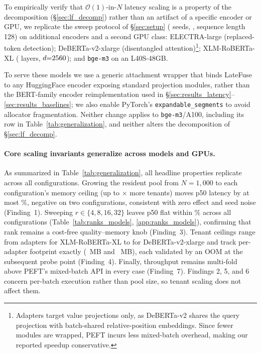 \documentclass[11pt]{article}
\newcommand{\sysname}{LateFuse}
\begin{document}
To empirically verify that $\mathcal{O}(1)$-in-$N$ latency scaling is a property of the
decomposition (\S\ref{sec:lf_decomp}) rather than an artifact of a specific encoder or GPU,
we replicate the sweep protocol of \S\ref{sec:setup} (\SweepNumSeeds{} seeds,
\HeadlineDtype{}, sequence length 128) on \GenNumNewEncoders{} additional encoders and a
second GPU class:
ELECTRA-large \cite{clark2020electra} (replaced-token detection);
DeBERTa-v2-xlarge \cite{he2021deberta} (disentangled attention)\footnote{Adapters target value projections only,
  as DeBERTa-v2 shares the query projection with
  batch-shared relative-position embeddings. Since fewer modules are wrapped,
  PEFT incurs less mixed-batch overhead, making our reported speedup
  conservative.};
XLM-RoBERTa-XL \cite{goyal-etal-2021-larger} (\GenXlmrLayers{} layers, $d{=}2560$);
and \texttt{bge-m3} on an L40S-48GB.

To serve these models we use a generic attachment wrapper that binds \sysname{}
to any HuggingFace encoder exposing standard projection modules, rather than the
BERT-family encoder reimplementation used in
\S\ref{sec:results_latency}--\ref{sec:results_baselines}; we also enable
PyTorch's \texttt{expandable\_segments} to avoid allocator fragmentation.
Neither change applies to \texttt{bge-m3}/A100, including its row in
Table~\ref{tab:generalization}, and neither alters the decomposition of
\S\ref{sec:lf_decomp}.

\paragraph{Core scaling invariants generalize across models and GPUs.}
As summarized in Table~\ref{tab:generalization}, all headline properties replicate across all
\GenNumConfigs{} configurations.
Growing the resident pool from $N{=}1{,}000$ to each configuration's memory ceiling (up to
\GenPoolGrowthMax$\times$ more tenants) moves p50 latency by at most \GenAtCeilingWorstPct\%,
negative on two configurations, consistent with zero effect and seed noise (Finding~1).
Sweeping $r \in \{4, 8, 16, 32\}$ leaves p50 flat within \GenRankSpreadAllMaxPct\% across all
\GenNumConfigs{} configurations (Table~\ref{tab:ranks_models}, \ref{app:ranks_models}), confirming that
rank remains a cost-free quality--memory knob (Finding~3).
Tenant ceilings range from \GenXlmrXLCeiling{} adapters for XLM-RoBERTa-XL to \GenDebertaCeiling{}
for DeBERTa-v2-xlarge and track per-adapter footprint exactly (\GenXlmrXLMB~MB and \GenDebertaMB~MB),
each validated by an OOM at the subsequent probe point (Finding~4).
Finally, throughput remains multi-fold above PEFT's mixed-batch API in every case (Finding~7).
Findings 2, 5, and 6 concern per-batch execution rather than pool size, so tenant scaling does not affect them.
\end{document}
